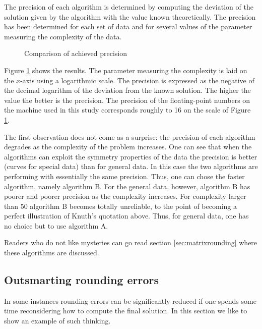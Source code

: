 \documentclass[twoside]{book}
\begin{document}
The precision of each algorithm is determined by computing the
deviation of the solution given by the algorithm with the value
known theoretically. The precision has been determined for each
set of data and for several values of the parameter measuring the
complexity of the data.

\begin{figure}
\center{}
\caption{Comparison of achieved precision} \label{fig:precision}
\end{figure}
Figure \ref{fig:precision} shows the results. The parameter
measuring the complexity is laid on the $x$-axis using a
logarithmic scale. The precision is expressed as the negative of
the decimal logarithm of the deviation from the known solution.
The higher the value the better is the precision. The precision of
the floating-point numbers on the machine used in this study
corresponds roughly to 16 on the scale of Figure
\ref{fig:precision}.

The first observation does not come as a surprise: the precision
of each algorithm degrades as the complexity of the problem
increases. One can see that when the algorithms can exploit the
symmetry properties of the data the precision is better (curves
for special data) than for general data. In this case the two
algorithms are performing with essentially the same precision.
Thus, one can chose the faster algorithm, namely algorithm B. For
the general data, however, algorithm B has poorer and poorer
precision as the complexity increases. For complexity larger than
50 algorithm B becomes totally unreliable, to the point of
becoming a perfect illustration of Knuth's quotation above. Thus,
for general data, one has no choice but to use algorithm A.

Readers who do not like mysteries can go read section
\ref{sec:matrixrounding} where these algorithms are discussed.

\subsection{Outsmarting rounding errors}
\label{sec:outsmart} In some instances rounding errors can be
significantly reduced if one spends some time reconsidering how to
compute the final solution. In this section we like to show an
example of such thinking.
\end{document}
